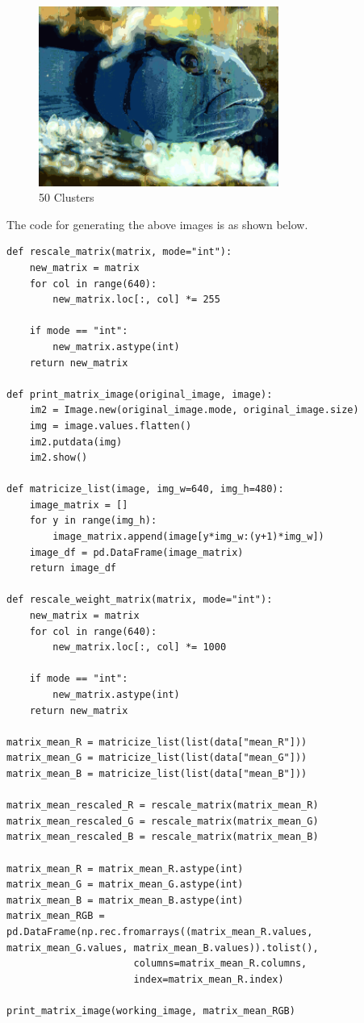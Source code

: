 \documentclass{article}      %
\begin{document}
    
\begin{figure}[H]
\centering
\includegraphics[width=0.7\textwidth]{parta_50_means}
\caption{50 Clusters}
\end{figure}



The code for generating the above images is as shown below.

\begin{lstlisting}
def rescale_matrix(matrix, mode="int"):
    new_matrix = matrix
    for col in range(640):
        new_matrix.loc[:, col] *= 255
    
    if mode == "int":
        new_matrix.astype(int)
    return new_matrix

def print_matrix_image(original_image, image):
    im2 = Image.new(original_image.mode, original_image.size)
    img = image.values.flatten()
    im2.putdata(img)
    im2.show()

def matricize_list(image, img_w=640, img_h=480):
    image_matrix = []
    for y in range(img_h):
        image_matrix.append(image[y*img_w:(y+1)*img_w])
    image_df = pd.DataFrame(image_matrix)
    return image_df

def rescale_weight_matrix(matrix, mode="int"):
    new_matrix = matrix
    for col in range(640):
        new_matrix.loc[:, col] *= 1000
    
    if mode == "int":
        new_matrix.astype(int)
    return new_matrix

matrix_mean_R = matricize_list(list(data["mean_R"]))
matrix_mean_G = matricize_list(list(data["mean_G"]))
matrix_mean_B = matricize_list(list(data["mean_B"]))

matrix_mean_rescaled_R = rescale_matrix(matrix_mean_R)
matrix_mean_rescaled_G = rescale_matrix(matrix_mean_G)
matrix_mean_rescaled_B = rescale_matrix(matrix_mean_B)

matrix_mean_R = matrix_mean_R.astype(int)
matrix_mean_G = matrix_mean_G.astype(int)
matrix_mean_B = matrix_mean_B.astype(int)
matrix_mean_RGB = pd.DataFrame(np.rec.fromarrays((matrix_mean_R.values, matrix_mean_G.values, matrix_mean_B.values)).tolist(),
                      columns=matrix_mean_R.columns,
                      index=matrix_mean_R.index)

print_matrix_image(working_image, matrix_mean_RGB)
\end{lstlisting}
\end{document}
